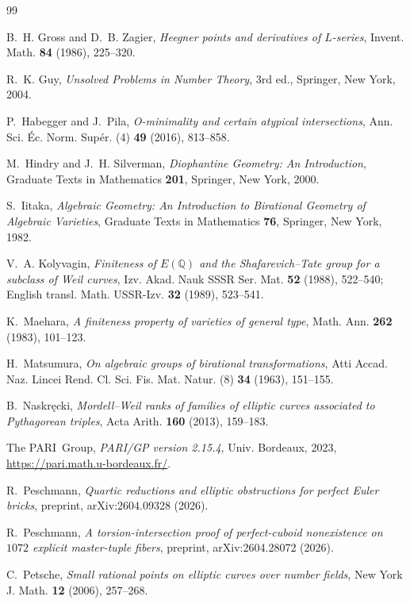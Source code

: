 \documentclass[11pt,reqno]{amsart}
\theoremstyle{plain}
\theoremstyle{definition}
\theoremstyle{remark}
\begin{document}
\begin{thebibliography}{99}

B.~H. Gross and D.~B. Zagier,
\emph{Heegner points and derivatives of $L$-series},
Invent. Math. \textbf{84} (1986), 225--320.

R.~K. Guy,
\emph{Unsolved Problems in Number Theory}, 3rd ed.,
Springer, New York, 2004.

P.~Habegger and J.~Pila,
\emph{O-minimality and certain atypical intersections},
Ann. Sci. \'Ec. Norm. Sup\'er. (4) \textbf{49} (2016), 813--858.

M.~Hindry and J.~H. Silverman,
\emph{Diophantine Geometry: An Introduction},
Graduate Texts in Mathematics \textbf{201}, Springer, New York, 2000.

S.~Iitaka,
\emph{Algebraic Geometry: An Introduction to Birational Geometry of Algebraic
Varieties},
Graduate Texts in Mathematics \textbf{76}, Springer, New York, 1982.

V.~A. Kolyvagin,
\emph{Finiteness of $E(\mathbb{Q})$ and the Shafarevich--Tate group for a subclass
of Weil curves},
Izv. Akad. Nauk SSSR Ser. Mat. \textbf{52} (1988), 522--540;
English transl. Math. USSR-Izv. \textbf{32} (1989), 523--541.

K.~Maehara,
\emph{A finiteness property of varieties of general type},
Math. Ann. \textbf{262} (1983), 101--123.

H.~Matsumura,
\emph{On algebraic groups of birational transformations},
Atti Accad. Naz. Lincei Rend. Cl. Sci. Fis. Mat. Natur. (8) \textbf{34} (1963),
151--155.

B.~Naskr\k{e}cki,
\emph{Mordell--Weil ranks of families of elliptic curves associated to Pythagorean
triples},
Acta Arith. \textbf{160} (2013), 159--183.

The PARI~Group,
\emph{PARI/GP version 2.15.4},
Univ. Bordeaux, 2023, \url{https://pari.math.u-bordeaux.fr/}.

R.~Peschmann,
\emph{Quartic reductions and elliptic obstructions for perfect Euler bricks},
preprint, arXiv:2604.09328 (2026).

R.~Peschmann,
\emph{A torsion-intersection proof of perfect-cuboid nonexistence on $1072$ explicit
master-tuple fibers},
preprint, arXiv:2604.28072 (2026).

C.~Petsche,
\emph{Small rational points on elliptic curves over number fields},
New York J. Math. \textbf{12} (2006), 257--268.


\end{thebibliography}
\end{document}
